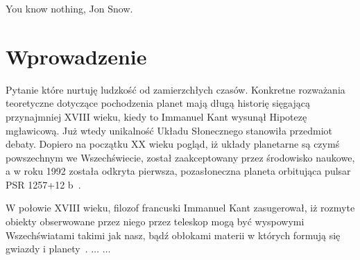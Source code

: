 \begin{savequote}[75mm]
   You know nothing, Jon Snow.
\end{savequote}

\chapter{Wprowadzenie}
 Pytanie które nurtuję ludzkość od
zamierzchłych czasów. Konkretne rozważania teoretyczne dotyczące pochodzenia
planet mają długą historię sięgającą przynajmniej XVIII wieku, kiedy to Immanuel
Kant wysunął \dq{}Hipotezę mgławicową\dq{}. Już wtedy unikalność Układu
Słonecznego stanowiła przedmiot debaty. Dopiero na początku XX wieku pogląd, iż
układy planetarne są czymś powszechnym we Wszechświecie, został zaakceptowany
przez środowisko naukowe, a w roku 1992 została odkryta pierwsza, pozasłoneczna
planeta orbitująca pulsar PSR 1257+12 b~\cite{1992Natur.355..145W}.

W połowie XVIII wieku, filozof francuski Immanuel Kant zasugerował, iż rozmyte
o\-biek\-ty obserwowane przez niego przez teleskop mogą być wyspowymi
Wszechświatami takimi jak nasz, bądź obłokami materii w których formują się
gwiazdy i planety~\cite{ImmanuelKant.etal:2008}. $\ldots$ $\ldots$


